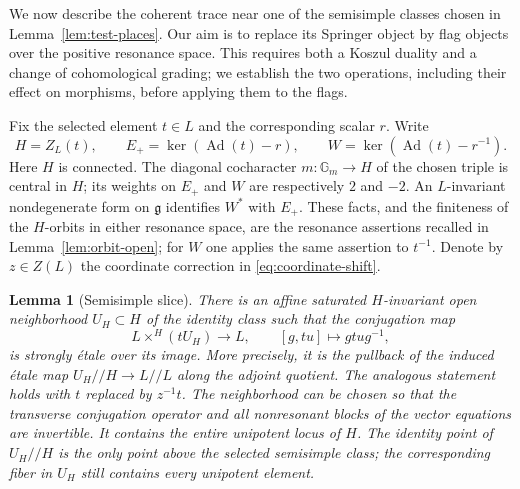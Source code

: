 \documentclass[11pt]{article}
\numberwithin{equation}{section}
\newtheorem{lemma}[theorem]{Lemma}
\theoremstyle{definition}
\theoremstyle{remark}
\newcommand{\g}{\mathfrak g}
\newcommand{\Ad}{\operatorname{Ad}}
\begin{document}
We now describe the coherent trace near one of the semisimple classes
chosen in Lemma~\ref{lem:test-places}.  Our aim is to replace its Springer
object by flag objects over the positive resonance space.  This requires
both a Koszul duality and a change of cohomological grading; we establish
the two operations, including their effect on morphisms, before applying
them to the flags.

Fix the selected element $t\in L$ and the corresponding scalar $r$.
Write
\[
 H=Z_L(t),\qquad
 E_+=\ker(\Ad(t)-r),\qquad
 W=\ker(\Ad(t)-r^{-1}).
\]
Here $H$ is connected.  The diagonal cocharacter
$m:\mathbb G_m\to H$ of the chosen triple is central in $H$; its
weights on $E_+$ and $W$ are respectively $2$ and $-2$.
An $L$-invariant nondegenerate form on $\g$ identifies $W^*$ with
$E_+$.  These facts, and the finiteness of the $H$-orbits in either
resonance space, are the resonance assertions recalled in
Lemma~\ref{lem:orbit-open}; for $W$ one applies the same assertion
to $t^{-1}$.  Denote by $z\in Z(L)$ the coordinate correction in
\eqref{eq:coordinate-shift}.

\begin{lemma}[Semisimple slice]\label{local:semisimple-slice}
There is an affine saturated $H$-invariant open neighborhood
$U_H\subset H$ of the identity class such that the conjugation map
\begin{equation}\label{local:eq-slice-map}
 L\mathbin{\times}^{H}(tU_H)\longrightarrow L,
 \qquad [g,tu]\longmapsto gtu g^{-1},
\end{equation}
is strongly \'etale over its image.  More precisely, it is the pullback
of the induced \'etale map $U_H/\!/H\to L/\!/L$ along the adjoint
quotient.  The analogous statement holds with $t$ replaced by $z^{-1}t$.
The neighborhood can be chosen so that the transverse conjugation
operator and all nonresonant blocks of the vector equations are
invertible.  It contains the entire unipotent locus of $H$.  The
identity point of $U_H/\!/H$ is the only point above the selected
semisimple class; the corresponding fiber in $U_H$ still contains
every unipotent element.
\end{lemma}
\end{document}
